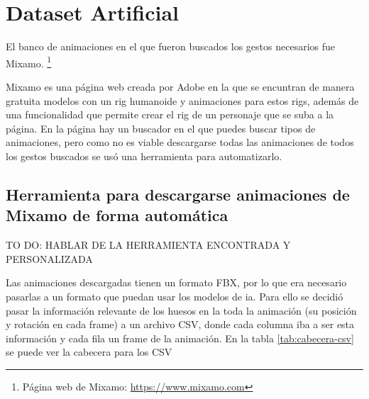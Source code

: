 \section{Dataset Artificial}
\label{sec:datasetArtificial}

El banco de animaciones en el que fueron buscados los gestos necesarios fue Mixamo. \footnote{Página web de Mixamo: \url{https://www.mixamo.com}}

Mixamo es una página web creada por Adobe en la que se encuntran de manera gratuita modelos con un \gls{rig} humanoide y animaciones para estos rigs, además de una funcionalidad que permite crear el \gls{rig} de un personaje que se suba a la página.
En la página hay un buscador en el que puedes buscar tipos de animaciones, pero como no es viable descargarse todas las animaciones de todos los gestos buscados se usó una herramienta para automatizarlo.

\subsection{Herramienta para descargarse animaciones de Mixamo de forma automática}

TO DO: HABLAR DE LA HERRAMIENTA ENCONTRADA Y PERSONALIZADA

Las animaciones descargadas tienen un formato \gls{FBX}, por lo que era necesario pasarlas a un formato que puedan usar los modelos de \gls{ia}.
Para ello se decidió pasar la información relevante de los huesos en la toda la animación (su posición y rotación en cada frame) a un archivo CSV, donde cada columna iba a ser esta información y cada fila un frame de la animación. En la tabla \ref{tab:cabecera-csv} se puede ver la cabecera para los CSV

